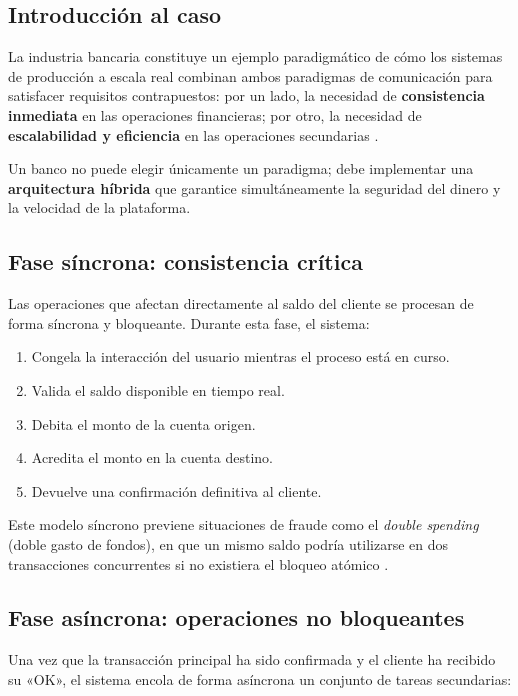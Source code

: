 \documentclass[12pt,a4paper]{article}
\begin{document}
\subsection{Introducción al caso}
 
La industria bancaria constituye un ejemplo paradigmático de cómo los sistemas de producción a escala real combinan ambos paradigmas de comunicación para satisfacer requisitos contrapuestos: por un lado, la necesidad de \textbf{consistencia inmediata} en las operaciones financieras; por otro, la necesidad de \textbf{escalabilidad y eficiencia} en las operaciones secundarias \cite{ref14}.
 
Un banco no puede elegir únicamente un paradigma; debe implementar una \textbf{arquitectura híbrida} que garantice simultáneamente la seguridad del dinero y la velocidad de la plataforma.
 
\subsection{Fase síncrona: consistencia crítica}
 
Las operaciones que afectan directamente al saldo del cliente se procesan de forma síncrona y bloqueante. Durante esta fase, el sistema:
 
\begin{enumerate}
  \item Congela la interacción del usuario mientras el proceso está en curso.
  \item Valida el saldo disponible en tiempo real.
  \item Debita el monto de la cuenta origen.
  \item Acredita el monto en la cuenta destino.
  \item Devuelve una confirmación definitiva al cliente.
\end{enumerate}
 
Este modelo síncrono previene situaciones de fraude como el \textit{double spending} (doble gasto de fondos), en que un mismo saldo podría utilizarse en dos transacciones concurrentes si no existiera el bloqueo atómico \cite{ref8}.
 
\subsection{Fase asíncrona: operaciones no bloqueantes}
 
Una vez que la transacción principal ha sido confirmada y el cliente ha recibido su «OK», el sistema encola de forma asíncrona un conjunto de tareas secundarias:
 
\end{document}
